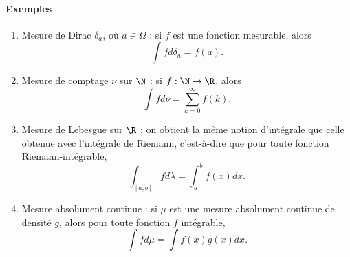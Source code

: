 %
%
%	
%
%
%
%	
%
%
%	


\paragraph{Exemples}

\begin{enumerate}
	\item Mesure de Dirac $\delta_a$, où $a\in \Omega$ : si $f$ est une fonction mesurable, alors
		$$\int f d\delta_a = f(a).$$
	\item Mesure de comptage $\nu$ sur $\N$ : si $f:\N\to \R$, alors
		$$\int f d\nu = \sum_{k=0}^\infty f(k).$$
	\item Mesure de Lebesgue sur $\R$ : on obtient la même notion d'intégrale que celle obtenue avec l'intégrale de Riemann, c'est-à-dire que pour toute fonction Riemann-intégrable,
		$$\int_{[a,b]} f d\lambda = \int_a^b f(x) dx.$$
	\item Mesure absolument continue : si $\mu$ est une mesure absolument continue de densité $g$, alors pour toute fonction $f$ intégrable,
		$$\int f d\mu = \int f(x)g(x) dx.$$
\end{enumerate}

